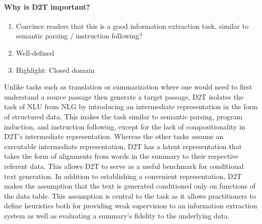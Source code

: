 \documentclass[11pt]{article}
\begin{document}
\paragraph{Why is D2T important?}
\begin{enumerate}
\item Convince readers that this is a good information extraction task,
similar to semantic parsing / instruction following?
\item Well-defined
\item Highlight: Closed domain
\end{enumerate}
Unlike tasks such as translation or summarization where one would
need to first understand a source passage then generate a target passage,
D2T isolates the task of NLU from NLG by introducing an intermediate representation in
the form of structured data.
This makes the task similar to semantic parsing, program induction, and instruction following,
except for the lack of compositionality in D2T's intermediate representation.
Whereas the other tasks assume an executable intermediate representation,
D2T has a latent representation that takes the form of alignments from 
words in the summary to their respective referent data.
This allows D2T to serve as a useful benchmark for conditional text generation.
In addition to establishing a convenient representation,
D2T makes the assumption that the text is generated conditioned only on
functions of the data table.
This assumption is central to the task as it allows
practitioners to define heuristics both for providing weak supervision to an
information extraction system as well as evaluating a summary's fidelity
to the underlying data.


\end{document}

